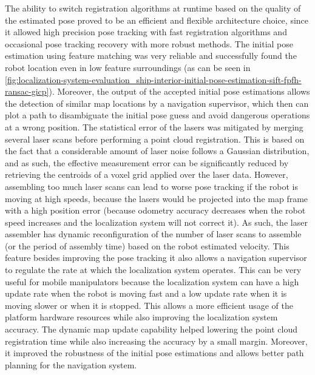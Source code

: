 The ability to switch registration algorithms at runtime based on the quality of the estimated pose proved to be an efficient and flexible architecture choice, since it allowed high precision pose tracking with fast registration algorithms and occasional pose tracking recovery with more robust methods. The initial pose estimation using feature matching was very reliable and successfully found the robot location even in low feature surroundings (as can be seen in \cref{fig:localization-system-evaluation_ship-interior-initial-pose-estimation-sift-fpfh-ransac-gicp}). Moreover, the output of the accepted initial pose estimations allows the detection of similar map locations by a navigation supervisor, which then can plot a path to disambiguate the initial pose guess and avoid dangerous operations at a wrong position. The statistical error of the lasers was mitigated by merging several laser scans before performing a point cloud registration. This is based on the fact that a considerable amount of laser noise follows a Gaussian distribution, and as such, the effective measurement error can be significantly reduced by retrieving the centroids of a voxel grid applied over the laser data. However, assembling too much laser scans can lead to worse pose tracking if the robot is moving at high speeds, because the lasers would be projected into the map frame with a high position error (because odometry accuracy decreases when the robot speed increases and the localization system will not correct it). As such, the laser assembler has dynamic reconfiguration of the number of laser scans to assemble (or the period of assembly time) based on the robot estimated velocity. This feature besides improving the pose tracking it also allows a navigation supervisor to regulate the rate at which the localization system operates. This can be very useful for mobile manipulators because the localization system can have a high update rate when the robot is moving fast and a low update rate when it is moving slower or when it is stopped. This allows a more efficient usage of the platform hardware resources while also improving the localization system accuracy. The dynamic map update capability helped lowering the point cloud registration time while also increasing the accuracy by a small margin. Moreover, it improved the robustness of the initial pose estimations and allows better path planning for the navigation system.



%
%
%
%
%
%
